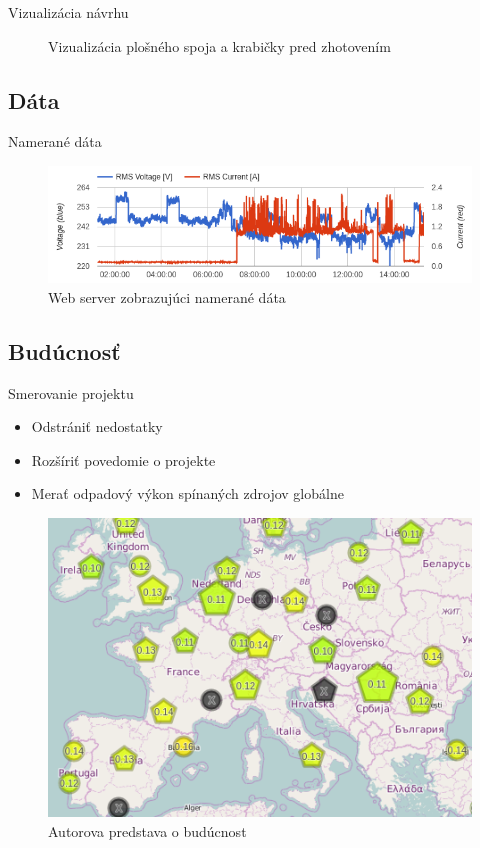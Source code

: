 \documentclass[hyperref={unicode}]{beamer}
\begin{document}
\begin{frame}{Vizualizácia návrhu}
\begin{figure}[htp]
		\caption{Vizualizácia plošného spoja a krabičky pred zhotovením}
	\end{figure}
\end{frame}



\subsection{Dáta}
\label{sub:Dáta}

\begin{frame}{Namerané dáta}
	\begin{figure}[htp]
		\centering
		\includegraphics[width=1\linewidth]{plot-preview}
		\caption{Web server zobrazujúci namerané dáta}
	\end{figure}
\end{frame}



\subsection{Budúcnosť}
\label{sub:Budúcnosť}

\begin{frame}{Smerovanie projektu}
	\begin{itemize}
		\item Odstrániť nedostatky
		\item Rozšíriť povedomie o projekte
		\item Merať odpadový výkon spínaných zdrojov globálne
	\end{itemize}

	\begin{figure}[htp]
		\centering
		\includegraphics[width=.65\linewidth]{map}
		\caption{Autorova predstava o budúcnost}
	\end{figure}
\end{frame}
\end{document}
